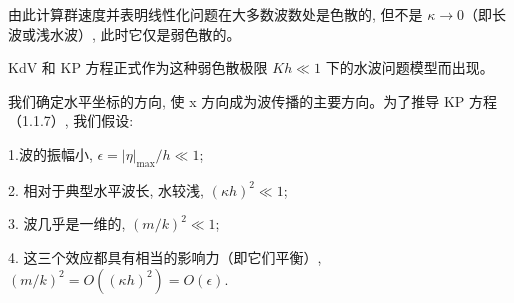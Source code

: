\documentclass[14pt,a4paper,oneside]{article}
\numberwithin{equation}{subsection}             %
\begin{document}
由此计算群速度并表明线性化问题在大多数波数处是色散的, 但不是 $\kappa \rightarrow  0$（即长波或浅水波）, 此时它仅是弱色散的。 

KdV 和 KP 方程正式作为这种弱色散极限 $Kh\ll1$ 下的水波问题模型而出现。

我们确定水平坐标的方向, 使 x 方向成为波传播的主要方向。为了推导 KP 方程（1.1.7）, 我们假设: 

1.波的振幅小, $\epsilon =|\eta|_{\mathrm{max}}/h \ll 1$;  

2. 相对于典型水平波长, 水较浅, $(\kappa h)^2 \ll 1$;  

3. 波几乎是一维的, $(m/k)^2 \ll 1$;  

4. 这三个效应都具有相当的影响力（即它们平衡）, $(m/k)^2 = O((\kappa h)^2) = O(\epsilon )$. 



\newpage

\clearpage           %
{}      %
{}   %


\end{document}
